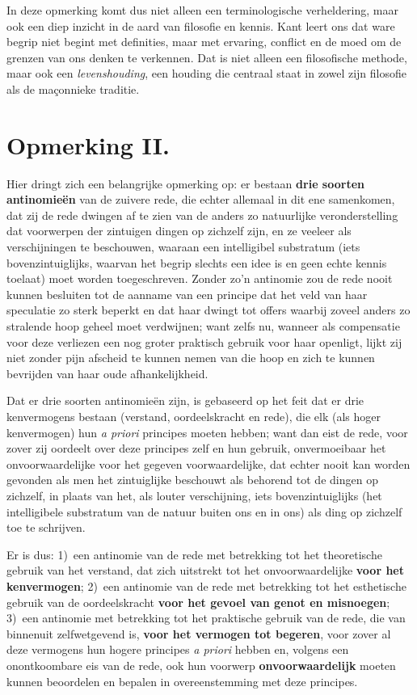 \begin{mdframed}[leftmargin=0pt,rightmargin=0pt,backgroundcolor=blue!6,linecolor=white,innertopmargin=6pt,innerbottommargin=6pt]
In deze opmerking komt dus niet alleen een terminologische verheldering, maar ook een diep inzicht in de aard van filosofie en kennis. Kant leert ons dat ware begrip niet begint met definities, maar met ervaring, conflict en de moed om de grenzen van ons denken te verkennen. Dat is niet alleen een filosofische methode, maar ook een \textit{levenshouding}, een houding die centraal staat in zowel zijn filosofie als de maçonnieke traditie.

\end{mdframed}

\section*{Opmerking II.}

Hier dringt zich een belangrijke opmerking op: er bestaan \textbf{drie soorten antinomieën} van de zuivere rede, die echter allemaal in dit ene samenkomen, dat zij de rede dwingen af te zien van de anders zo natuurlijke veronderstelling dat voorwerpen der zintuigen dingen op zichzelf zijn, en ze veeleer als verschijningen te beschouwen, waaraan een intelligibel substratum (iets bovenzintuiglijks, waarvan het begrip slechts een idee is en geen echte kennis toelaat) moet worden toegeschreven. Zonder zo'n antinomie zou de rede nooit kunnen besluiten tot de aanname van een principe dat het veld van haar speculatie zo sterk beperkt en dat haar dwingt tot offers waarbij zoveel anders zo stralende hoop geheel moet verdwijnen; want zelfs nu, wanneer als compensatie voor deze verliezen een nog groter praktisch gebruik voor haar openligt, lijkt zij niet zonder pijn afscheid te kunnen nemen van die hoop en zich te kunnen bevrijden van haar oude afhankelijkheid.

Dat er drie soorten antinomieën zijn, is gebaseerd op het feit dat er drie kenvermogens bestaan (verstand, oordeelskracht en rede), die elk (als hoger kenvermogen) hun \textit{a priori} principes moeten hebben; want dan eist de rede, voor zover zij oordeelt over deze principes zelf en hun gebruik, onvermoeibaar het onvoorwaardelijke voor het gegeven voorwaardelijke, dat echter nooit kan worden gevonden als men het zintuiglijke beschouwt als behorend tot de dingen op zichzelf, in plaats van het, als louter verschijning, iets bovenzintuiglijks (het intelligibele substratum van de natuur buiten ons en in ons) als ding op zichzelf toe te schrijven.

Er is dus: 1)~een antinomie van de rede met betrekking tot het theoretische gebruik van het verstand, dat zich uitstrekt tot het onvoorwaardelijke \textbf{voor het kenvermogen}; 2)~een antinomie van de rede met betrekking tot het esthetische gebruik van de oordeelskracht \textbf{voor het gevoel van genot en misnoegen}; 3)~een antinomie met betrekking tot het praktische gebruik van de rede, die van binnenuit zelfwetgevend is, \textbf{voor het vermogen tot begeren}, voor zover al deze vermogens hun hogere principes \textit{a priori} hebben en, volgens een onontkoombare eis van de rede, ook hun voorwerp \textbf{onvoorwaardelijk} moeten kunnen beoordelen en bepalen in overeenstemming met deze principes.


